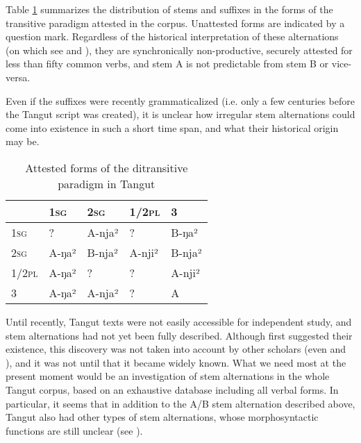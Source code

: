 \documentclass[oldfontcommands,oneside,a4paper,11pt]{article}
\newcommand{\ipa}[1]{{\phon \mbox{#1}}} %
\newcommand{\sg}{\textsc{sg}}
\newcommand{\pl}{\textsc{pl}}
\begin{document}
Table \ref{tab:paradigm} summarizes the distribution of stems and suffixes in the forms of the transitive paradigm attested in the corpus. Unattested forms are indicated by a question mark. Regardless of the historical interpretation of these alternations (on which see \citealt{jacques09tangutverb} and \citealt{jacques14esquisse}), they are synchronically non-productive, securely attested for less than fifty common verbs, and stem A is not predictable from stem B or vice-versa. %

Even if the suffixes were recently grammaticalized (i.e. only a few centuries before the Tangut script was created), it is unclear how irregular stem alternations could come into existence in such a short time span, and what their historical origin may be.

\begin{table}[H]
\caption{Attested forms of the ditransitive paradigm in Tangut}\centering  \label{tab:paradigm}
\begin{tabular}{lllll}
\toprule
	&	1\sg{}	&	2\sg{}	&	1/2\pl{}	&	3	\\
	\midrule
1\sg{}	&	?	&	A-\ipa{nja²}	&	?	&	 B-\ipa{ŋa²}	\\
2\sg{}	&	A-\ipa{ŋa²}	&	B-\ipa{nja²}	&	A-\ipa{nji²}	&	 B-\ipa{nja²}	\\
1/2\pl{}	&	 A-\ipa{ŋa²}	& ?	&	?	&	A-\ipa{nji²}	\\
3	&	A-\ipa{ŋa²}	&	A-\ipa{nja²}	&	?	&	A 	\\
\bottomrule
\end{tabular}
\end{table}

Until recently, Tangut texts were not easily accessible for independent study, and stem alternations had not yet been fully described. Although \citet{nishida75} first suggested their existence, this discovery was not taken into account by other scholars (even \citealt{kepping85} and \citealt{driem91tangut}), and it was not until \citet{gong01huying} that it became widely known. What we need most at the present moment would be an investigation of stem alternations in the whole Tangut corpus, based on an exhaustive database including all verbal forms. In particular, it seems that in addition to the A/B stem alternation described above, Tangut also had other types of stem alternations, whose morphosyntactic functions are still unclear (see \citealt{jacques14esquisse}).
\end{document}
